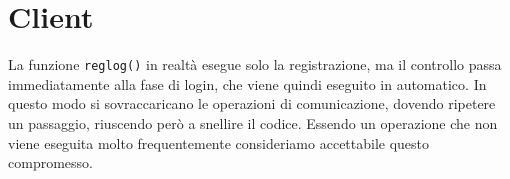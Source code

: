 \documentclass[a4paper, 11pt]{article} %
\begin{document}
\section*{Client}
La funzione \texttt{reglog()} in realtà esegue solo la registrazione, ma il controllo passa immediatamente alla fase di login, che viene quindi eseguito in automatico. In questo modo si sovraccaricano le operazioni di comunicazione, dovendo ripetere un passaggio, riuscendo però a snellire il codice. Essendo un operazione che non viene eseguita molto frequentemente consideriamo accettabile questo compromesso. 
	
\end{document}
